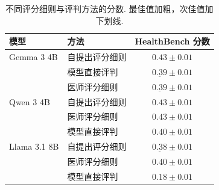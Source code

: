 \begin{longtable}{llc}
\caption{不同评分细则与评判方法的分数. 最佳值加粗，次佳值加下划线.}\label{cat-tab:healthbench-rubrics}\\

        \toprule
        模型 & 方法 & HealthBench 分数 \\
        \midrule
        Gemma 3 4B 
        & 自提出评分细则 & $\mathbf{0.43} \pm 0.01$ \\
        & 模型直接评判       & $\underline{0.39} \pm 0.01$ \\
        & 医师评分细则     & $\underline{0.39} \pm 0.01$ \\
        \midrule
        Qwen 3 4B
        & 自提出评分细则 & $\mathbf{0.43} \pm 0.01$ \\
        & 医师评分细则     & $\mathbf{0.43} \pm 0.01$ \\
        & 模型直接评判       & $0.40 \pm 0.01$ \\
        \midrule
        Llama 3.1 8B
        & 自提出评分细则 & $\underline{0.38} \pm 0.01$ \\
        & 医师评分细则     & $\mathbf{0.40} \pm 0.01$ \\
        & 模型直接评判       & $0.18 \pm 0.01$ \\
        \bottomrule
    
\end{longtable}
